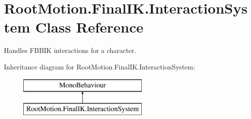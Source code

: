 \hypertarget{class_root_motion_1_1_final_i_k_1_1_interaction_system}{}\section{Root\+Motion.\+Final\+I\+K.\+Interaction\+System Class Reference}
\label{class_root_motion_1_1_final_i_k_1_1_interaction_system}


Handles F\+B\+B\+IK interactions for a character.  


Inheritance diagram for Root\+Motion.\+Final\+I\+K.\+Interaction\+System\+:\begin{figure}[H]
\begin{center}
\leavevmode
\includegraphics[height=2.000000cm]{class_root_motion_1_1_final_i_k_1_1_interaction_system}
\end{center}
\end{figure}
